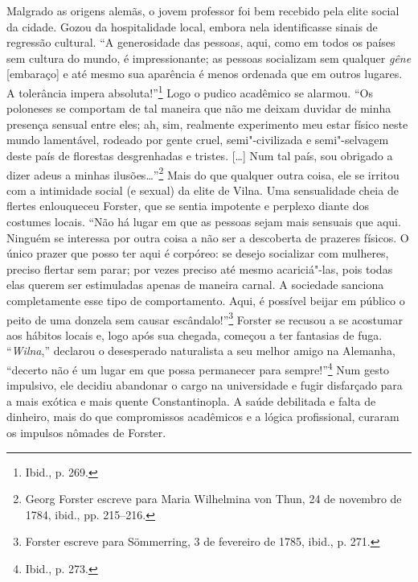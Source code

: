 \asterisc

Malgrado as origens alemãs, o jovem professor foi bem recebido pela
elite social da cidade. Gozou da hospitalidade local, embora nela
identificasse sinais de regressão cultural. ``A generosidade das
pessoas, aqui, como em todos os países sem cultura do mundo, é
impressionante; as pessoas socializam sem qualquer \textit{gêne}
{[}embaraço{]} e até mesmo sua aparência é menos ordenada que em outros
lugares. A tolerância impera absoluta!''\footnote{Ibid., p. 269.} Logo o
pudico acadêmico se alarmou. ``Os poloneses se comportam de tal maneira
que não me deixam duvidar de minha presença sensual entre eles; ah, sim,
realmente experimento meu estar físico neste mundo lamentável, rodeado
por gente cruel, semi"-civilizada e semi"-selvagem deste país de florestas
desgrenhadas e tristes. [\ldots{}] Num tal país, sou obrigado a dizer adeus
a minhas ilusões\ldots{}''\footnote{Georg Forster escreve para Maria Wilhelmina von Thun, 24 de novembro de 1784, ibid., pp. 215--216.} Mais do que qualquer outra coisa, ele se irritou com a intimidade social (e
sexual) da elite de Vilna. Uma sensualidade cheia de flertes enlouqueceu
Forster, que se sentia impotente e perplexo diante dos costumes locais.
``Não há lugar em que as pessoas sejam mais sensuais que aqui. Ninguém
se interessa por outra coisa a não ser a descoberta de prazeres físicos.
O único prazer que posso ter aqui é corpóreo: se desejo socializar com
mulheres, preciso flertar sem parar; por vezes preciso até mesmo
acariciá"-las, pois todas elas querem ser estimuladas apenas de maneira
carnal. A sociedade sanciona completamente esse tipo de comportamento.
Aqui, é possível beijar em público o peito de uma donzela sem causar
escândalo!''\footnote{Forster escreve para Sömmerring, 3 de fevereiro de 1785, ibid., p. 271.} Forster se recusou a se acostumar aos hábitos locais e, logo após sua chegada, começou a ter fantasias de fuga.
``\textit{Wilna},'' declarou o desesperado naturalista a seu melhor amigo na
Alemanha, ``decerto não é um lugar em que possa permanecer para
sempre!''\footnote{Ibid., p. 273.} Num gesto impulsivo, ele decidiu
abandonar o cargo na universidade e fugir disfarçado para a mais exótica
e mais quente Constantinopla. A saúde debilitada e falta de dinheiro,
mais do que compromissos acadêmicos e a lógica profissional, curaram os
impulsos nômades de Forster.

